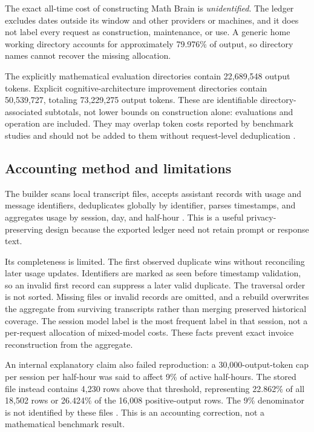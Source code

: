 The exact all-time cost of constructing Math Brain is \emph{unidentified}. The ledger excludes dates outside its window and other providers or machines, and it does not label every request as construction, maintenance, or use. A generic home working directory accounts for approximately 79.976\% of output, so directory names cannot recover the missing allocation.

The explicitly mathematical evaluation directories contain 22,689,548 output tokens. Explicit cognitive-architecture improvement directories contain 50,539,727, totaling 73,229,275 output tokens. These are identifiable directory-associated subtotals, not lower bounds on construction alone: evaluations and operation are included. They may overlap token costs reported by benchmark studies and should not be added to them without request-level deduplication \citep{ledgersessions}.

\subsection{Accounting method and limitations}

The builder scans local transcript files, accepts assistant records with usage and message identifiers, deduplicates globally by identifier, parses timestamps, and aggregates usage by session, day, and half-hour \citep{ledgerbuilder}. This is a useful privacy-preserving design because the exported ledger need not retain prompt or response text.

Its completeness is limited. The first observed duplicate wins without reconciling later usage updates. Identifiers are marked as seen before timestamp validation, so an invalid first record can suppress a later valid duplicate. The traversal order is not sorted. Missing files or invalid records are omitted, and a rebuild overwrites the aggregate from surviving transcripts rather than merging preserved historical coverage. The session model label is the most frequent label in that session, not a per-request allocation of mixed-model costs. These facts prevent exact invoice reconstruction from the aggregate.

An internal explanatory claim also failed reproduction: a 30,000-output-token cap per session per half-hour was said to affect 9\% of active half-hours. The stored file instead contains 4,230 rows above that threshold, representing 22.862\% of all 18,502 rows or 26.424\% of the 16,008 positive-output rows. The 9\% denominator is not identified by these files \citep{ledgerreadme,ledgerhalf}. This is an accounting correction, not a mathematical benchmark result.

